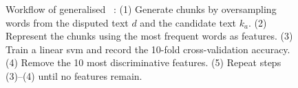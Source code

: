 \begin{figure}[htbp]
    \centering
    
    \caption[Generalised \unmasking{} workflow]{Workflow of generalised \unmasking{}~\citep{bevendorff_generalizing_2019}: 
    (1) Generate chunks by oversampling words from the disputed text $d$ and the candidate text $k_a$. 
    (2) Represent the chunks using the most frequent words as features. 
    (3) Train a linear \ac{svm} and record the 10-fold cross-validation accuracy. 
    (4) Remove the 10 most discriminative features. 
    (5) Repeat steps (3)–(4) until no features remain.}
    \label{fig:generalized_unmasking}
\end{figure}
